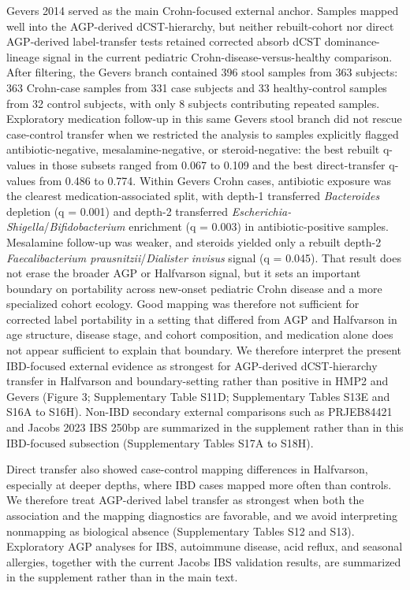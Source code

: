 \documentclass[
  11pt,
]{article}
\newcommand{\taxon}[1]{\emph{#1}}
\newcommand{\dcstsep}{/\allowbreak}
\begin{document}
Gevers 2014 served as the main Crohn-focused external anchor. Samples
mapped well into the AGP-derived dCST-hierarchy, but neither rebuilt-cohort nor
direct AGP-derived label-transfer tests retained corrected absorb dCST
dominance-lineage signal in the current pediatric
Crohn-disease-versus-healthy comparison. After filtering, the Gevers
branch contained 396 stool samples from 363 subjects: 363 Crohn-case
samples from 331 case subjects and 33 healthy-control samples from 32
control subjects, with only 8 subjects contributing repeated samples.
Exploratory medication follow-up in this same Gevers stool branch did
not rescue case-control transfer when we restricted the analysis to
samples explicitly flagged antibiotic-negative, mesalamine-negative, or
steroid-negative: the best rebuilt q-values in those subsets ranged from
0.067 to 0.109 and the best direct-transfer q-values from 0.486 to
0.774. Within Gevers Crohn cases, antibiotic exposure was the clearest
medication-associated split, with depth-1 transferred
\taxon{Bacteroides} depletion (q = 0.001) and depth-2 transferred
\taxon{Escherichia-Shigella}\dcstsep\taxon{Bifidobacterium} enrichment
(q = 0.003) in antibiotic-positive samples. Mesalamine follow-up was
weaker, and steroids yielded only a rebuilt depth-2
\taxon{Faecalibacterium prausnitzii}\dcstsep\taxon{Dialister invisus}
signal (q = 0.045). That result does not erase the broader AGP or
Halfvarson signal, but it sets an important boundary on portability
across new-onset pediatric Crohn disease and a more specialized cohort
ecology. Good mapping was therefore not sufficient for corrected label
portability in a setting that differed from AGP and Halfvarson in age
structure, disease stage, and cohort composition, and medication alone
does not appear sufficient to explain that boundary. We therefore
interpret the present IBD-focused external evidence as strongest for
AGP-derived dCST-hierarchy transfer in Halfvarson and
boundary-setting rather than positive in HMP2 and Gevers (Figure 3;
Supplementary Table S11D; Supplementary Tables S13E and S16A to S16H).
Non-IBD secondary external comparisons such as PRJEB84421 and Jacobs
2023 IBS 250bp are summarized in the supplement rather than in this
IBD-focused subsection (Supplementary Tables S17A to S18H).

Direct transfer also showed case-control mapping differences in
Halfvarson, especially at deeper depths, where IBD cases mapped more
often than controls. We therefore treat AGP-derived label transfer as
strongest when both the association and the mapping diagnostics are
favorable, and we avoid interpreting nonmapping as biological absence
(Supplementary Tables S12 and S13). Exploratory AGP analyses for IBS,
autoimmune disease, acid reflux, and seasonal allergies, together with
the current Jacobs IBS validation results, are summarized in the
supplement rather than in the main text.
\end{document}
